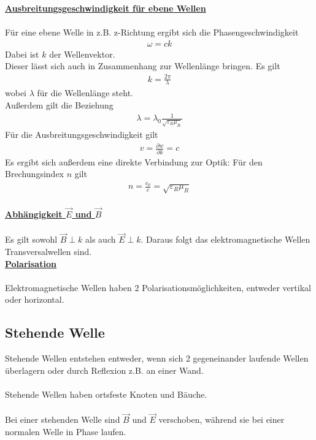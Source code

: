 \documentclass[a4paper,12pt]{report}
\begin{document}
\underline{\textbf{Ausbreitungsgeschwindigkeit für ebene Wellen}} \\\\
Für eine ebene Welle in z.B. z-Richtung ergibt sich die Phasengeschwindigkeit 
\begin{align}
\omega = ck
\end{align}
Dabei ist $k$ der Wellenvektor. \\
Dieser lässt sich auch in Zusammenhang zur Wellenlänge bringen. Es gilt 
\begin{align}
k = \frac{2\pi}{\lambda} 
\end{align}
wobei $\lambda$ für die Wellenlänge steht.\\
Außerdem gilt die Beziehung 
\begin{align}
\lambda = \lambda_0 \frac{1}{\sqrt{\varepsilon_R \mu_R}}
\end{align}
Für die Ausbreitungsgeschwindigkeit gilt 
\begin{align}
v = \frac{\partial w}{\partial k} = c
\end{align}
Es ergibt sich außerdem eine direkte Verbindung zur Optik: Für den Brechungsindex $n$ gilt 
\begin{align}
n = \frac{c_0}{c} = \sqrt{\varepsilon_R\mu_R}
\end{align} \\

\underline{\textbf{Abhängigkeit $\vec{E}$ und $\vec{B}$ }} \\\\
Es gilt sowohl $\vec{B} \perp k$ als auch $\vec{E} \perp k$. Daraus folgt das elektromagnetische Wellen Transversalwellen sind. \\

\underline{\textbf{Polarisation}} \\\\
Elektromagnetische Wellen haben 2 Polarisationsmöglichkeiten, entweder vertikal oder horizontal. 

\subsection{Stehende Welle}

Stehende Wellen entstehen entweder, wenn sich 2 gegeneinander laufende Wellen überlagern oder durch Reflexion z.B. an einer Wand. \\\\
Stehende Wellen haben ortsfeste Knoten und Bäuche. \\\\
Bei einer stehenden Welle sind $\vec{B}$ und $\vec{E}$ verschoben, während sie bei einer normalen Welle in Phase laufen.
\end{document}
